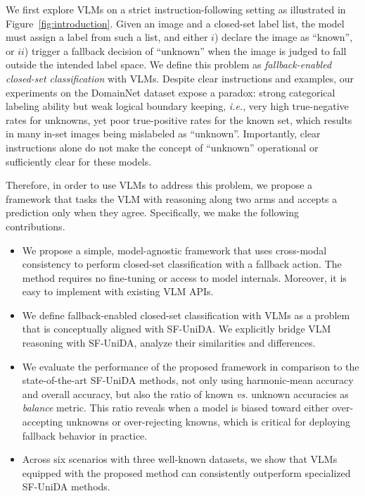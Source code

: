 \documentclass[10pt]{article} %
\begin{document}
We first explore VLMs on a strict instruction-following setting as illustrated in Figure~\ref{fig:introduction}.
Given an image and a closed-set label list, the model must assign a label from such a list, and either $i$) declare the image as ``known'', or $ii$) trigger a fallback decision of ``unknown'' when the image is judged to fall outside the intended label space.
We define this problem as {\em fallback-enabled closed-set classification} with VLMs.
Despite clear instructions and examples, our experiments on the DomainNet dataset expose a paradox: strong categorical labeling ability but weak logical boundary keeping, {\em i.e.}, very high true-negative rates for unknowns, yet poor true-positive rates for the known set, which results in many in-set images being mislabeled as ``unknown''.
Importantly, clear instructions alone do not make the concept of ``unknown'' operational or sufficiently clear for these models. 

Therefore, in order to use VLMs to address this problem, we propose a framework that tasks the VLM with reasoning along two arms and accepts a prediction only when they agree.
Specifically, we make the following contributions.
%
\begin{itemize}
    \item We propose a simple, model-agnostic framework that uses cross-modal consistency to perform closed-set classification with a fallback action.
    The method requires no fine-tuning or access to model internals.
    Moreover, it is easy to implement with existing VLM APIs.
    \item We define fallback-enabled closed-set classification with VLMs as a problem that is conceptually aligned with SF-UniDA.
    We explicitly bridge VLM reasoning with SF-UniDA, analyze their similarities and differences.
    \item We evaluate the performance of the proposed framework in comparison to the state-of-the-art SF-UniDA methods, not only using harmonic-mean accuracy and overall accuracy, but also the ratio of known {\em vs.} unknown accuracies as {\em balance} metric.
    This ratio reveals when a model is biased toward either over-accepting unknowns or over-rejecting knowns, which is critical for deploying fallback behavior in practice. 
    \item Across six scenarios with three well-known datasets, we show that VLMs equipped with the proposed method can consistently outperform specialized SF-UniDA methods.
\end{itemize}
\end{document}
